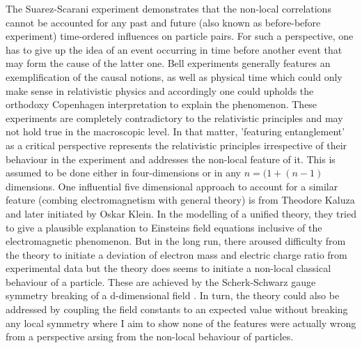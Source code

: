 \documentclass{article}
\begin{document}
The Suarez-Scarani experiment demonstrates that the non-local correlations cannot be accounted for any past and future (also known as before-before experiment) time-ordered influences on particle pairs\cite{1}. For such a perspective, one has to give up the idea of an event occurring in time before another event that may form the cause of the latter one. Bell experiments generally features an exemplification of the causal notions, as well as physical time which could only make sense in relativistic physics and accordingly one could upholds the orthodoxy Copenhagen interpretation to explain the phenomenon. These experiments are completely contradictory to the relativistic principles and may not hold true in the macroscopic level. In that matter, 'featuring entanglement' as a critical perspective represents the relativistic principles irrespective of their behaviour in the experiment and addresses the non-local feature of it. This is assumed to be done either in four-dimensions or in any $n=(1+(n-1)$ dimensions. One influential five dimensional approach to account for a similar feature (combing electromagnetism with general theory) is from Theodore Kaluza and later initiated by Oskar Klein. In the modelling of a unified theory, they tried to give a plausible explanation to Einsteins field equations inclusive of the electromagnetic phenomenon. But in the long run, there aroused difficulty from the theory to initiate a deviation of electron mass and electric charge ratio from experimental data but the theory does seems to initiate a non-local classical behaviour of a particle\cite{2}. These are achieved by the Scherk-Schwarz gauge symmetry breaking of a d-dimensional field \cite{3}. In turn, the theory could also be addressed by coupling the field constants to an expected value without breaking any local symmetry \cite{4} where I aim to show none of the features were actually wrong from a perspective arsing from the non-local behaviour of particles. \vspace{4mm} \newline
\end{document}
